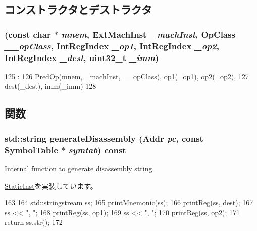 \subsection{コンストラクタとデストラクタ}
\hypertarget{classMcrrOp_aecdb116a7a7d35431cd42e4075a531ee}{
\subsubsection[{McrrOp}]{ (const char $\ast$ {\em mnem}, \/  {\bf ExtMachInst} {\em \_\-machInst}, \/  OpClass {\em \_\-\_\-opClass}, \/  {\bf IntRegIndex} {\em \_\-op1}, \/  {\bf IntRegIndex} {\em \_\-op2}, \/  {\bf IntRegIndex} {\em \_\-dest}, \/  {\bf uint32\_\-t} {\em \_\-imm})}}
\label{classMcrrOp_aecdb116a7a7d35431cd42e4075a531ee}



\begin{DoxyCode}
125                           :
126         PredOp(mnem, _machInst, __opClass), op1(_op1), op2(_op2),
127         dest(_dest), imm(_imm)
128     {}

\end{DoxyCode}


\subsection{関数}
\hypertarget{classMcrrOp_a95d323a22a5f07e14d6b4c9385a91896}{
\subsubsection[{generateDisassembly}]{\setlength{\rightskip}{0pt plus 5cm}std::string generateDisassembly ({\bf Addr} {\em pc}, \/  const SymbolTable $\ast$ {\em symtab}) const}}
\label{classMcrrOp_a95d323a22a5f07e14d6b4c9385a91896}
Internal function to generate disassembly string. 

\hyperlink{classStaticInst_ab4a569d2623620c04f8a52bbd91d63b9}{StaticInst}を実装しています。


\begin{DoxyCode}
163 {
164     std::stringstream ss;
165     printMnemonic(ss);
166     printReg(ss, dest);
167     ss << ", ";
168     printReg(ss, op1);
169     ss << ", ";
170     printReg(ss, op2);
171     return ss.str();
172 }
\end{DoxyCode}


